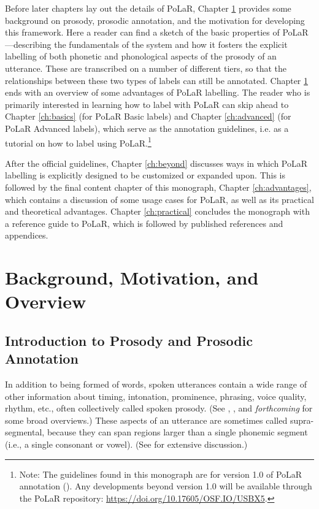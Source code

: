 \documentclass[11pt, twoside]{memoir}
\begin{document}
Before later chapters lay out the details of PoLaR, Chapter \ref{ch:background} provides some background on prosody, prosodic annotation, and the motivation for developing this framework. Here a reader can find a sketch of the basic properties of PoLaR —describing the fundamentals of the system and how it fosters the explicit labelling of both phonetic and phonological aspects of the prosody of an utterance. These are transcribed on a number of different tiers, so that the relationships between these two types of labels can still be annotated. 
Chapter \ref{ch:background} ends with an overview of some advantages of PoLaR labelling. The reader who is primarily interested in learning how to label with PoLaR can skip ahead to Chapter \ref{ch:basics} (for PoLaR Basic labels) and Chapter \ref{ch:advanced} (for PoLaR Advanced labels), which serve as the annotation guidelines, i.e. as a tutorial on how to label using PoLaR.\footnote{Note: The guidelines found in this monograph are for version 1.0 of PoLaR annotation (\citealt{ahn-21}). Any developments beyond version 1.0 will be available through the PoLaR repository: \href{https://doi.org/10.17605/OSF.IO/USBX5}{https://doi.org/10.17605/OSF.IO/USBX5}.}

After the official guidelines, Chapter \ref{ch:beyond} discusses ways in which PoLaR labelling is explicitly designed to be customized or expanded upon. This is followed by the final content chapter of this monograph, Chapter \ref{ch:advantages}, which contains a discussion of some usage cases for PoLaR, as well as its practical and theoretical advantages. Chapter \ref{ch:practical} concludes the monograph with a reference guide to PoLaR, which is followed by published references and appendices.

\renewcommand*{\thefootnote}{\arabic{footnote}}



\chapter{Background, Motivation, and Overview}\label{ch:background}

\section{Introduction to Prosody and Prosodic Annotation}\label{sec:introduction-to-prosody-and-prosodic-annotation}

In addition to being formed of words, spoken utterances contain a wide range of other information about timing, intonation, prominence, phrasing, voice quality, rhythm, etc., often collectively called spoken prosody. (See \citealt{ladd08}, \citealt{beckmanvenditti11}, and \citeauthor{barnesshattuckhufnagel20} \textit{forthcoming} for some broad overviews.) These aspects of an utterance are sometimes called supra-segmental, because they can span regions larger than a single phonemic segment (i.e., a single consonant or vowel). (See \citealt{lehiste70} for extensive discussion.)
\end{document}
